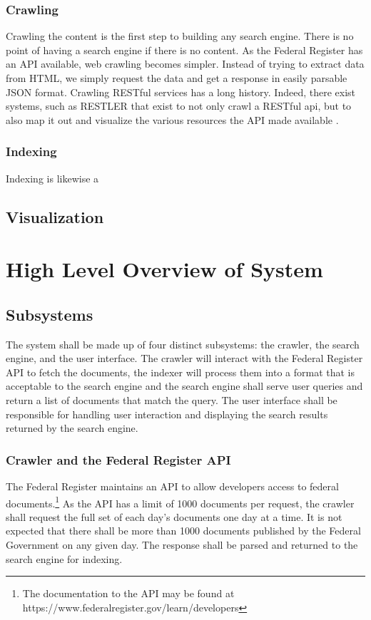 \documentclass{sig-alternate-05-2015}
\begin{document}
\subsubsection{Crawling}
Crawling the content is the first step to building any search engine. There is no point of having a search engine if there is no content. As the Federal Register has an API available, web crawling becomes simpler. Instead of trying to extract data from HTML, we simply request the data and get a response in easily parsable JSON format. Crawling RESTful services has a long history. Indeed, there exist systems, such as RESTLER that exist to not only crawl a RESTful api, but to also map it out and visualize the various resources the API made available \cite{REST}.
\subsubsection{Indexing}
Indexing is likewise a 
\subsection{Visualization}

\section{High Level Overview of System}
\subsection{Subsystems}
The system shall be made up of four distinct subsystems: the crawler, the search engine, and the user interface. The crawler will interact with the Federal Register API to fetch the documents, the indexer will process them into a format that is acceptable to the search engine and the search engine shall serve user queries and return a list of documents that match the query. The user interface shall be responsible for handling user interaction and displaying the search results returned by the search engine.

\subsubsection{Crawler and the Federal Register API}
The Federal Register maintains an API to allow developers access to federal documents.\footnote{The documentation to the API may be found at https://www.federalregister.gov/learn/developers} As the API has a limit of 1000 documents per request, the crawler shall request the full set of each day's documents one day at a time. It is not expected that there shall be more than 1000 documents published by the Federal Government on any given day. The response shall be parsed and returned to the search engine for indexing. 
\end{document}
